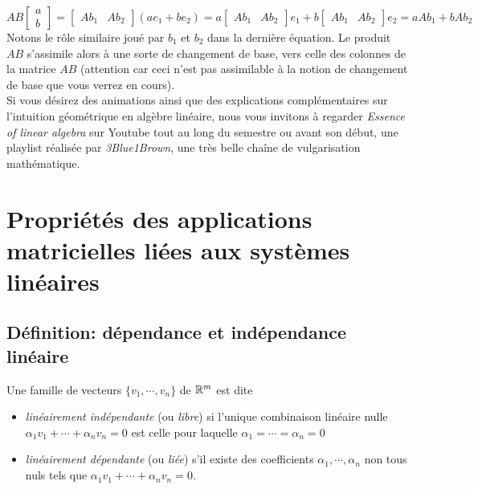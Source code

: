 $$AB\begin{bmatrix}
a \\ b
\end{bmatrix} = \begin{bmatrix} Ab_1 & Ab_2 \end{bmatrix}(ae_1+be_2)= a\begin{bmatrix} Ab_1 & Ab_2 \end{bmatrix}e_1 + b\begin{bmatrix} Ab_1 & Ab_2 \end{bmatrix}e_2 = aAb_1 + bAb_2
$$
Notons le rôle similaire joué par $b_1$ et $b_2$ dans la dernière équation. Le produit $AB$ s'assimile alors à une sorte de changement de base, vers celle des colonnes de la matrice $AB$ (attention car ceci n'est pas assimilable à la notion de changement de base que vous verrez en cours).\\
\noindent Si vous désirez des animations ainsi que des explications complémentaires sur l'intuition géométrique en algèbre linéaire, nous vous invitons à regarder \textit{Essence of linear algebra} sur Youtube tout au long du semestre ou avant son début, une playlist réalisée par \textit{3Blue1Brown}, une très belle chaîne de vulgarisation mathématique.


\section{Propriétés des applications matricielles liées aux systèmes linéaires}

\subsection{Définition: dépendance et indépendance linéaire}
\begin{boxdef}
Une famille de vecteurs $\{ {v_1},\cdots, {v_n} \}$ de $\mathbb{R}^m$ est dite 
\begin{itemize}
    \item \textit{linéairement indépendante} (ou \textit{libre}) si l'unique combinaison linéaire nulle $ \alpha_1 {v_1} + \cdots + \alpha_n {v_n} = {0}$ est celle pour laquelle $\alpha_1 = \cdots = \alpha_n = 0$
    \item \textit{linéairement dépendante} (ou \textit{liée}) s'il existe des coefficients $\alpha_1,\cdots, \alpha_n $ non tous nuls tels que $ \alpha_1 {v_1} + \cdots + \alpha_n {v_n} = {0}$.
\end{itemize}
\end{boxdef}

